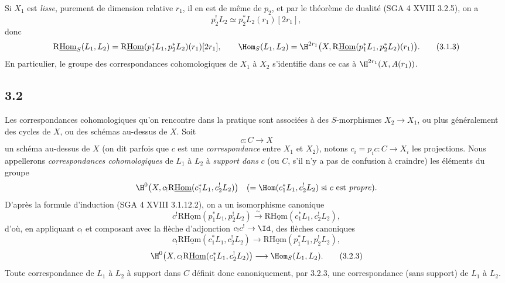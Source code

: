 Si $X_1$ est \emph{lisse}, purement de dimension relative $r_1$, il en est de même de $p_2$, et par le théorème de dualité (SGA 4 XVIII 3.2.5), on a
\[
p_2^!L_2\simeq p_2^*L_2(r_1)[2r_1],
\]
donc
\begin{equation}
\mathrm{R}\underline{\mathrm{Hom}}_S(L_1,L_2)=\mathrm{R}\underline{\mathrm{Hom}}(p_1^*L_1,p_2^*L_2)(r_1)[2r_1],
\qquad
\Hom_S(L_1,L_2)=\H^{2r_1}\bigl(X,\mathrm{R}\underline{\mathrm{Hom}}(p_1^*L_1,p_2^*L_2)(r_1)\bigr).
\tag{3.1.3}
\end{equation}
En particulier, le groupe des correspondances cohomologiques de $X_1$ à $X_2$ s'identifie dans ce cas à $\H^{2r_1}(X,A(r_1))$.

\subsection*{3.2}
Les correspondances cohomologiques qu'on rencontre dans la pratique sont associées à des $S$-morphismes $X_2\to X_1$, ou plus généralement des cycles de $X$, ou des schémas au-dessus de $X$. Soit
\[
c:C\longrightarrow X
\]
un schéma au-dessus de $X$ (on dit parfois que $c$ est une \emph{correspondance} entre $X_1$ et $X_2$), notons $c_i=p_ic:C\to X_i$ les projections. Nous appellerons \emph{correspondances cohomologiques} de $L_1$ à $L_2$ à \emph{support dans} $c$ (ou $C$, s'il n'y a pas de confusion à craindre) les éléments du groupe
\[
\H^0\bigl(X,c_!\mathrm{R}\underline{\mathrm{Hom}}(c_1^*L_1,c_2^!L_2)\bigr)
\quad(=\Hom(c_1^*L_1,c_2^!L_2)\text{ si }c\text{ est \emph{propre}}).
\]
D'après la formule d'induction (SGA 4 XVIII 3.1.12.2), on a un isomorphisme canonique
\begin{equation}
c^!\mathrm{R}\underline{\mathrm{Hom}}(p_1^*L_1,p_2^!L_2)
\xrightarrow{\sim}
\mathrm{R}\underline{\mathrm{Hom}}(c_1^*L_1,c_2^!L_2),
\tag{3.2.1}
\end{equation}
d'où, en appliquant $c_!$ et composant avec la flèche d'adjonction $c_!c^!\to \Id$, des flèches canoniques
\begin{equation}
c_!\mathrm{R}\underline{\mathrm{Hom}}(c_1^*L_1,c_2^!L_2)
\longrightarrow
\mathrm{R}\underline{\mathrm{Hom}}(p_1^*L_1,p_2^!L_2),
\tag{3.2.2}
\end{equation}
\begin{equation}
\H^0\bigl(X,c_!\mathrm{R}\underline{\mathrm{Hom}}(c_1^*L_1,c_2^!L_2)\bigr)
\longrightarrow
\Hom_S(L_1,L_2).
\tag{3.2.3}
\end{equation}
Toute correspondance de $L_1$ à $L_2$ à support dans $C$ définit donc canoniquement, par 3.2.3, une correspondance (sans support) de $L_1$ à $L_2$.

